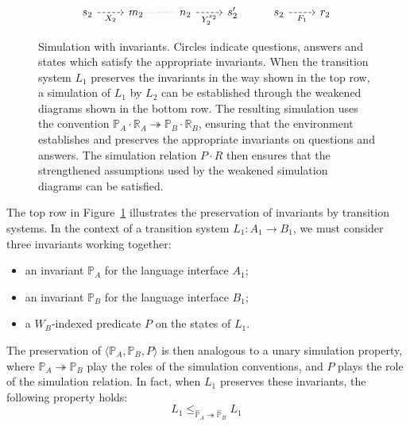\documentclass[11pt,oneside]{book}
\theoremstyle{definition}
\begin{document}
\begin{figure}
\[\begin{tikzcd}
      |[alias=X12]| s_2 \ar[r, "X_2"', dashed] &
      |[alias=X22]| m_2 \ar[r, dotted, dash] &
      |[alias=Y12]| n_2 \ar[r, "Y_2^{s_2}"', dashed] &
      |[alias=Y22]| s_2' &
      |[alias=F12]| s_2 \ar[r, "F_1"', dashed] &
      |[alias=F22]| r_2
    \end{tikzcd}
  \]
  \caption[Simulation with invariants]%
   {Simulation with invariants.
    Circles indicate questions, answers and states
    which satisfy the appropriate invariants.
    When the transition system $L_1$ preserves the invariants
    in the way shown in the top row,
    a simulation of $L_1$ by $L_2$ can be established through
    the weakened diagrams shown in the bottom row.
    The resulting simulation uses the convention
    $\mathbb{P}_A \cdot \mathbb{R}_A \twoheadrightarrow
     \mathbb{P}_B \cdot \mathbb{R}_B$,
    ensuring that the environment
    establishes and preserves the appropriate invariants
    on questions and answers.
    The simulation relation $P \cdot R$ then ensures that
    the strengthened assumptions used by the
    weakened simulation diagrams can be satisfied.}
  \label{fig:fsim-inv}
\end{figure}

The top row in Figure~\ref{fig:fsim-inv}
illustrates the preservation of invariants by transition systems.
In the context of a transition system
$L_1 : A_1 \rightarrow B_1$,
we must consider three invariants working together:
\begin{itemize}
  \item an invariant $\mathbb{P}_A$ for the language interface $A_1$;
  \item an invariant $\mathbb{P}_B$ for the language interface $B_1$;
  \item a $W_B$-indexed predicate $P$ on the states of $L_1$.
\end{itemize}
The preservation of
$\langle \mathbb{P}_A, \mathbb{P}_B, P \rangle$
is then analogous to a unary simulation property,
where $\mathbb{P}_A \twoheadrightarrow \mathbb{P}_B$
play the roles of the simulation conventions,
and $P$ plays the role of the simulation relation.
In fact,
when $L_1$ preserves these invariants,
the following property holds:
\[
    L_1 \le_{\hat{\mathbb{P}}_A \twoheadrightarrow \hat{\mathbb{P}}_B} L_1
\]
\end{document}
